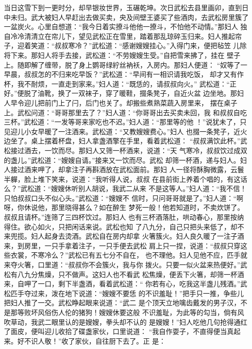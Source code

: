 当日这雪下到一更时分，却早银妆世界，玉碾乾坤。次日武松去县里画卯，直到日
中未归。武大被妇人早赶出去做买卖，央及间壁王婆买了些酒肉，去武松房里簇了
一盆炭火。心里自想道：“我今日着实撩斗他他一撩斗，不怕他不动情。”那妇人
独自冷冷清清立在帘儿下，望见武松正在雪里，踏着那乱琼碎玉归来。妇人推起帘
子，迎着笑道：“叔叔寒冷？”武松道：“感谢嫂嫂挂心。”入得门来，便把毡笠
儿除将下来。那妇人将手去接，武松道：“不劳嫂嫂生受。”自把雪来拂了，挂在
壁子上。随即解了缠带，脱了身上鹦哥绿紵丝衲袄，入房内。那妇人便道：
“奴等了一早晨，叔叔怎的不归来吃早饭？”武松道：“早间有一相识请我吃饭，
却才又有作杯，我不耐烦，一直走到家来。”妇人道：“既恁的，请叔叔向火。”
武松道：“正好。”便脱了油靴，换了一双袜子，穿了暖鞋，掇条凳子，自近火盆
边坐地。那妇人早令迎儿把前门上了闩，后门也关了。却搬些煮熟菜蔬入房里来，
摆在桌子上。武松问道：“哥哥那里去了？”妇人道：“你哥哥出去买卖未回，我
和叔叔自吃三杯。”武松道：“一发等哥来家吃也不迟。”妇人道：“那里等的他
！”说犹未了，只见迎儿小女早暖了一注酒来。武松道：“又教嫂嫂费心。”妇人
也掇一条凳子，近火边坐了。桌上摆着杯盘，妇人拿盏酒擎在手里，看着武松道：
“叔叔满饮此杯。”武松接过酒去，一饮而尽。那妇人又筛一杯酒来，说道：“天
气寒冷，叔叔饮过成双的盏儿。”武松道：“嫂嫂自请。”接来又一饮而尽。武松
却筛一杯酒，递与妇人。妇人接过酒来呷了，却拿注子再斟酒放在武松面前。那妇
人一径将酥胸微露，云鬟半軃，脸上堆下笑来，说道：“我听得人说，叔叔
在县前街上养着个唱的，有这话么？”武松道：“嫂嫂休听别人胡说，我武二从来
不是这等人。”妇人道：“我不信！只怕叔叔口头不似心头。”武松道：“嫂嫂不
信时，只问哥哥就是了。”妇人道：“啊呀，你休说他，那里晓得甚么？如在醉生
梦死一般！他若知道时，不卖炊饼了。叔叔且请杯。”连筛了三四杯饮过。那妇人
也有三杯酒落肚，哄动春心，那里按纳得住。欲心如火，只把闲话来说。武松也知
了八九分，自己只把头来低了，却不来兜揽。妇人起身去烫酒。武松自在房内却拿
火箸簇火。妇人良久暖了一注子酒来，到房里，一只手拿着注子，一只手便去武松
肩上只一捏，说道：“叔叔只穿这些衣裳，不寒冷么？”武松已有五七分不自在，
也不理他。妇人见他不应，匹手就来夺火箸，口里道：“叔叔你不会簇火，我与你
拨火。只要一似火盆来热便好。”武松有八九分焦燥，只不做声。这妇人也不看武
松焦燥，便丢下火箸，却筛一杯酒来，自呷了一口，剩下半盏酒，看着武松道：“
你若有心，吃我这半盏儿残酒。”武松匹手夺过来，泼在地下说道：“嫂嫂不要恁
的不识羞耻！”把手只一推，争些儿把妇人推了一交。武松睁起眼来说道：“武二
是个顶天立地噙齿戴发的男子汉，不是那等败坏风俗伤人伦的猪狗！嫂嫂休要这般
不识羞耻，为此等的勾当，倘有风吹草动，我武二眼里认的是嫂嫂，拳头却不认的
是嫂嫂！”妇人吃他几句抢得通红了面皮，便叫迎儿收拾了碟盏家伙，口里说道：
“我自作耍子，不直得便当真起来。好不识人敬！”收了家伙，自往厨下去了。正
是：

